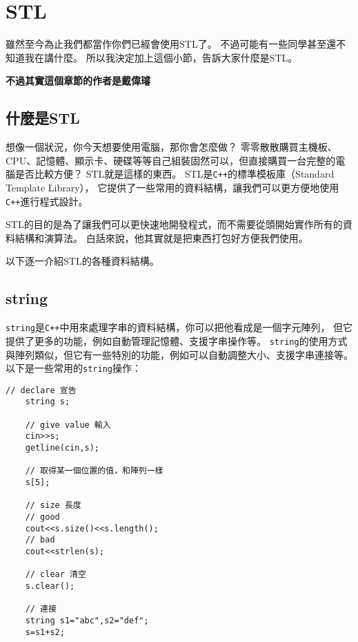 \section{STL}
    雖然至今為止我們都當作你們已經會使用STL了。
    不過可能有一些同學甚至還不知道我在講什麼。
    所以我決定加上這個小節，告訴大家什麼是STL。

    \textbf{不過其實這個章節的作者是戴偉璿}

    \author{戴偉璿}

    \subsection{什麼是STL}

    想像一個狀況，你今天想要使用電腦，那你會怎麼做？
    零零散散購買主機板、CPU、記憶體、顯示卡、硬碟等等自己組裝固然可以，但直接購買一台完整的電腦是否比較方便？
    STL就是這樣的東西。
    STL是\texttt{C++}的標準模板庫（Standard Template Library），
    它提供了一些常用的資料結構，讓我們可以更方便地使用\texttt{C++}進行程式設計。

    STL的目的是為了讓我們可以更快速地開發程式，而不需要從頭開始實作所有的資料結構和演算法。
    白話來說，他其實就是把東西打包好方便我們使用。
    
    以下逐一介紹STL的各種資料結構。
    
    \subsection{string}
    \texttt{string}是\texttt{C++}中用來處理字串的資料結構，你可以把他看成是一個字元陣列，
    但它提供了更多的功能，例如自動管理記憶體、支援字串操作等。
    \texttt{string}的使用方式與陣列類似，但它有一些特別的功能，例如可以自動調整大小、支援字串連接等。
    \newpage
    以下是一些常用的\texttt{string}操作：

    \begin{lstlisting}[caption=string 用法]
    // declare 宣告
    string s;

    // give value 輸入
    cin>>s;
    getline(cin,s); 

    // 取得某一個位置的值，和陣列一樣
    s[5];

    // size 長度
    // good
    cout<<s.size()<<s.length();
    // bad
    cout<<strlen(s);

    // clear 清空
    s.clear();
    
    // 連接
    string s1="abc",s2="def";
    s=s1+s2;
    \end{lstlisting}

